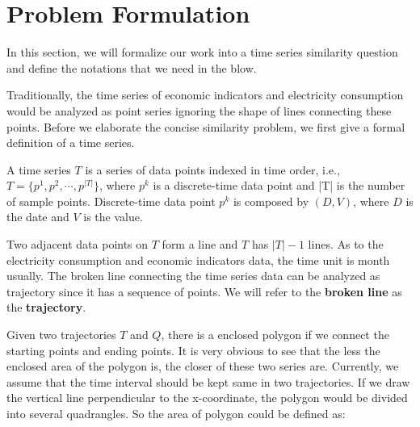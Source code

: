 

\section{Problem Formulation} \label{sec:prem}
In this section, we will formalize our work into a time series similarity question and define the notations that we need in the blow.

Traditionally, the time series of economic indicators and electricity consumption would be analyzed as point series ignoring the shape of lines connecting these points. Before we elaborate the concise similarity problem, we first give a formal definition of a time series. 

\newcommand{\loci}[1]{\ensuremath{p^{#1}}}
\begin{definition}
A time series $T$ is a series of data points indexed in time order, i.e., $T=\{\loci{1}, \loci{2}, \cdots, \loci{|T|}\}$, where $\loci{k}$ is a discrete-time data point and |T| is the number of sample points. Discrete-time data point $\loci{k}$ is composed by $\left(D,V\right)$, where $D$ is the date and $V$ is the value.
\end{definition}

Two adjacent data points on $T$ form a line and $T$ has $|T|-1$ lines. As to the electricity consumption and economic indicators data, the time unit is month usually. The broken line connecting the time series data can be analyzed as trajectory since it has a sequence of points. We will refer to the \textbf{broken line} as the \textbf{trajectory}.

Given two trajectories $T$ and $Q$, there is a enclosed polygon if we connect the starting points and ending points. It is very obvious to see that the less the enclosed area of the polygon is, the closer of these two series are. Currently, we assume that the time interval should be kept same in two trajectories. If we draw the vertical line perpendicular to the x-coordinate, the polygon would be divided into several quadrangles. So the area of polygon could be defined as: 

